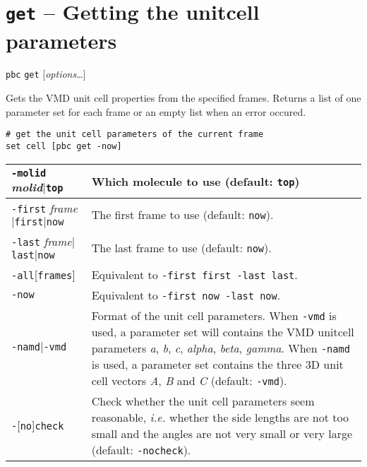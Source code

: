 \documentclass[a4paper, DIV12]{scrartcl}
\newcommand{\ie}{\emph{i.e.}\xspace}
\begin{document}
\newpage
\section{\texttt{get} -- Getting the unitcell parameters}
\label{sec:get}

\texttt{pbc} \texttt{get} [\textit{options}\dots]

Gets the VMD unit cell properties from the specified frames. Returns a
list of one parameter set for each frame or an empty list when an
error occured.


\begin{Verbatim}
# get the unit cell parameters of the current frame
set cell [pbc get -now]
\end{Verbatim}


\begin{tabular}{|p{}|p{}|}
\hline

\texttt{-molid} \textit{molid}$|$\texttt{top}
& Which molecule to use (default: \texttt{top})
\\ \hline

\texttt{-first} \textit{frame}$|$\texttt{first}$|$\texttt{now}
&  The first frame to use (default: \texttt{now}).
\\ \hline

\texttt{-last} \textit{frame}$|$\texttt{last}$|$\texttt{now}
& The last frame to use (default: \texttt{now}).
\\ \hline

\texttt{-all}[\texttt{frames}]
& Equivalent to \texttt{-first first -last last}.
\\ \hline

\texttt{-now}
& Equivalent to \texttt{-first now -last now}.
\\ \hline

\texttt{-namd}$|$\texttt{-vmd}
& Format of the unit cell parameters. When \texttt{-vmd}
is used, a parameter set will contains the VMD unitcell
parameters \textit{a}, \textit{b}, \textit{c}, \textit{alpha},
\textit{beta}, \textit{gamma}. When \texttt{-namd} is used, a
parameter set contains the three 3D unit cell vectors \textit{A},
\textit{B} and \textit{C} (default: \texttt{-vmd}).
\\ \hline  

\texttt{-}[\texttt{no}]\texttt{check}
& Check whether the unit cell parameters seem reasonable, \ie whether
the side lengths are not too small and the angles are not very small
or very large (default: \texttt{-nocheck}).
\\ \hline  

\end{tabular}
\end{document}
